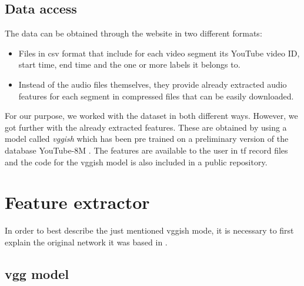 \subsection{Data access}
\label{subsection:data-access}

	The data can be obtained through the website \cite{SoundUnderstandinggroup2017} in two different formats:
	
	\begin{itemize}
		\item Files in \acrshort{csv} format that include for each video segment its YouTube video ID, start time, end time and the one or more labels it belongs to. 
		\item Instead of the audio files themselves, they provide already extracted audio features for each segment in compressed files that can be easily downloaded.
	\end{itemize}

	For our purpose, we worked with the dataset in both different ways. However, we got further with the already extracted features.  These are obtained by using a model called \textit{\acrshort{vgg}ish} \cite{Hershey2017} which has been pre trained on a preliminary version of the database YouTube-8M \cite{VideoUnderstandingGroup2017}. The features are available to the user in \acrfull{tf} \cite{GoogleResearch2015} record files and the code for the \acrshort{vgg}ish model is also included in a public repository. 

\section{Feature extractor}
\label{section:feature-extractor}

	In order to best describe the just mentioned \acrshort{vgg}ish mode, it is necessary to first explain the original network it was based in . 
	
\subsection{\acrfull{vgg} model}
\label{subsection:vgg}
	
